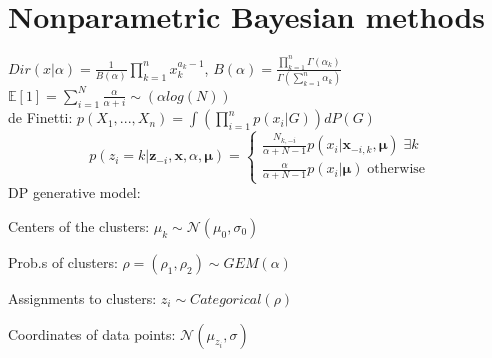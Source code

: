 \section{Nonparametric Bayesian methods}
$Dir(x|\alpha) = \frac{1}{B(\alpha)} \prod_{k=1}^n x_k^{a_k - 1}$, $B(\alpha) = \frac{\prod_{k=1}^n \Gamma(\alpha_k)}{\Gamma(\sum_{k=1}^n \alpha_k)}$ \\
$\mathbb{E}[1] = \sum_{i=1}^N \frac{\alpha}{\alpha + i} \sim(\alpha log(N))$ \\
de Finetti: $p(X_1, ..., X_n) {=} \int (\prod_{i=1}^n p(x_i|G))dP(G)$ \\
\[ p(z_i=k|\bm{z}_{-i},\bm{x},\alpha,\bm{\mu}) = \begin{cases}
      \frac{N_{k,-i}}{\alpha + N - 1} p(x_i|\bm{x}_{-i,k},\bm{\mu}) \;\exists k \\
      \frac{\alpha}{\alpha + N - 1} p(x_i|\bm{\mu}) \;\text{otherwise}
   \end{cases}
\]
DP generative model: \\
\begin{inparaitem}[\color{red}\textbullet]
\item Centers of the clusters: $\mu_k \sim \mathcal{N}(\mu_0, \sigma_0)$ \\
\item Prob.s of clusters: $\rho = (\rho_1, \rho_2) \sim  GEM(\alpha)$ \\
\item Assignments to clusters: $z_i \sim Categorical(\rho)$ \\
\item Coordinates of data points: $\mathcal{N}(\mu_{z_i}, \sigma)$
\end{inparaitem}